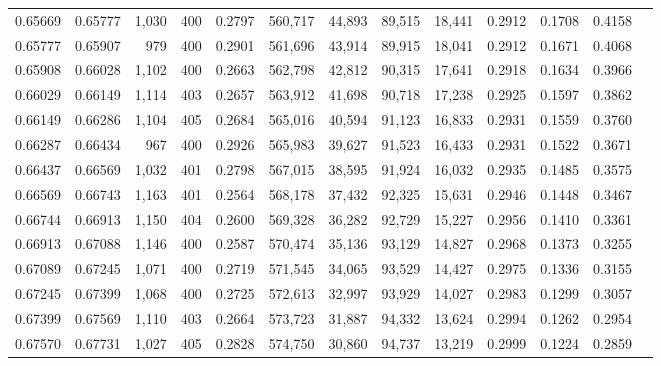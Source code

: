 \begin{tabular}{rrrrrrrrrrrrr}
0.65669 & 0.65777 & 1,030 & 400 &                                     0.2797 & 560,717 &  44,893 &  89,515 &  18,441 & 0.2912 & 0.1708 & 0.4158 \\
0.65777 & 0.65907 &   979 & 400 &                                     0.2901 & 561,696 &  43,914 &  89,915 &  18,041 & 0.2912 & 0.1671 & 0.4068 \\
0.65908 & 0.66028 & 1,102 & 400 &                                     0.2663 & 562,798 &  42,812 &  90,315 &  17,641 & 0.2918 & 0.1634 & 0.3966 \\
0.66029 & 0.66149 & 1,114 & 403 &                                     0.2657 & 563,912 &  41,698 &  90,718 &  17,238 & 0.2925 & 0.1597 & 0.3862 \\
0.66149 & 0.66286 & 1,104 & 405 &                                     0.2684 & 565,016 &  40,594 &  91,123 &  16,833 & 0.2931 & 0.1559 & 0.3760 \\
0.66287 & 0.66434 &   967 & 400 &                                     0.2926 & 565,983 &  39,627 &  91,523 &  16,433 & 0.2931 & 0.1522 & 0.3671 \\
0.66437 & 0.66569 & 1,032 & 401 &                                     0.2798 & 567,015 &  38,595 &  91,924 &  16,032 & 0.2935 & 0.1485 & 0.3575 \\
0.66569 & 0.66743 & 1,163 & 401 &                                     0.2564 & 568,178 &  37,432 &  92,325 &  15,631 & 0.2946 & 0.1448 & 0.3467 \\
0.66744 & 0.66913 & 1,150 & 404 &                                     0.2600 & 569,328 &  36,282 &  92,729 &  15,227 & 0.2956 & 0.1410 & 0.3361 \\
0.66913 & 0.67088 & 1,146 & 400 &                                     0.2587 & 570,474 &  35,136 &  93,129 &  14,827 & 0.2968 & 0.1373 & 0.3255 \\
0.67089 & 0.67245 & 1,071 & 400 &                                     0.2719 & 571,545 &  34,065 &  93,529 &  14,427 & 0.2975 & 0.1336 & 0.3155 \\
0.67245 & 0.67399 & 1,068 & 400 &                                     0.2725 & 572,613 &  32,997 &  93,929 &  14,027 & 0.2983 & 0.1299 & 0.3057 \\
0.67399 & 0.67569 & 1,110 & 403 &                                     0.2664 & 573,723 &  31,887 &  94,332 &  13,624 & 0.2994 & 0.1262 & 0.2954 \\
0.67570 & 0.67731 & 1,027 & 405 &                                     0.2828 & 574,750 &  30,860 &  94,737 &  13,219 & 0.2999 & 0.1224 & 0.2859 \\

\end{tabular}
